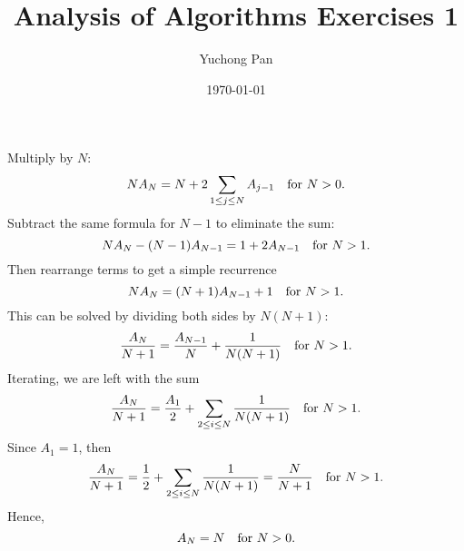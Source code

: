 \documentclass[letterpaper, reqno,11pt]{article}
\begin{document}
\title{Analysis of Algorithms Exercises 1}
\author{Yuchong Pan}
\date{\today}
\newtheorem{thm}{Theorem}[section]
\newtheorem{lemma}{Lemma}[section]
\newtheorem{defn}{Definition}[section]
\maketitle
%

 Multiply by $N$:
\begin{equation*}
    NA_N=N+2\sum_{1\leq j\leq N}A_{j-1}\quad{\rm for}\ N>0.
\end{equation*}
Subtract the same formula for $N-1$ to eliminate the sum:
\begin{equation*}
    NA_N-(N-1)A_{N-1}=1+2A_{N-1}\quad{\rm for}\ N>1.
\end{equation*}
Then rearrange terms to get a simple recurrence
\begin{equation*}
    NA_N=(N+1)A_{N-1}+1\quad{\rm for}\ N>1.
\end{equation*}
This can be solved by dividing both sides by $N(N+1)$:
\begin{equation*}
    \frac{A_N}{N+1}=\frac{A_{N-1}}{N}+\frac{1}{N(N+1)}\quad{\rm for}\ N>1.
\end{equation*}
Iterating, we are left with the sum
\begin{equation*}
    \frac{A_N}{N+1}=\frac{A_1}{2}+\sum_{2\leq i\leq N}\frac{1}{N(N+1)}\quad{\rm for}\ N>1.
\end{equation*}
Since $A_1=1$, then
\begin{equation*}
    \frac{A_N}{N+1}=\frac{1}{2}+\sum_{2\leq i\leq N}\frac{1}{N(N+1)}=\frac{N}{N+1}\quad{\rm for}\ N>1.
\end{equation*}
Hence,
\begin{equation*}
    A_N=N\quad{\rm for}\ N>0.
\end{equation*}
\end{document}
